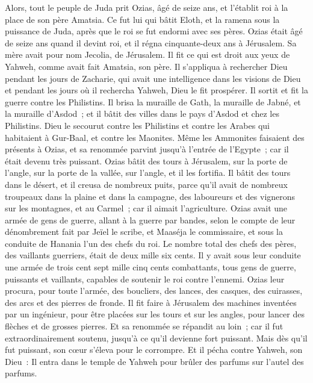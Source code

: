 \begin{multicols}{2}
\VerseOne{}Alors, tout le peuple de Juda prit Ozias, âgé de seize ans, et l'établit roi à la place de son père Amatsia.
Ce fut lui qui bâtit Eloth, et la ramena sous la puissance de Juda, après que le roi se fut endormi avec ses pères.
Ozias était âgé de seize ans quand il devint roi, et il régna cinquante-deux ans à Jérusalem. Sa mère avait pour nom Jecolia, de Jérusalem.
Il fit ce qui est droit aux yeux de Yahweh, comme avait fait Amatsia, son père.
Il s'appliqua à rechercher Dieu pendant les jours de Zacharie, qui avait une intelligence dans les visions de Dieu et pendant les jours où il rechercha Yahweh, Dieu le fit prospérer.
Il sortit et fit la guerre contre les Philistins. Il brisa la muraille de Gath, la muraille de Jabné, et la muraille d'Asdod~; et il bâtit des villes dans le pays d'Asdod et chez les Philistins.
Dieu le secourut contre les Philistins et contre les Arabes qui habitaient à Gur-Baal, et contre les Maonites.
Même les Ammonites faisaient des présents à Ozias, et sa renommée parvint jusqu'à l'entrée de l'Egypte~; car il était devenu très puissant.
Ozias bâtit des tours à Jérusalem, sur la porte de l'angle, sur la porte de la vallée, sur l'angle, et il les fortifia.
Il bâtit des tours dans le désert, et il creusa de nombreux puits, parce qu'il avait de nombreux troupeaux dans la plaine et dans la campagne, des laboureurs et des vignerons sur les montagnes, et au Carmel~; car il aimait l'agriculture.
Ozias avait une armée de gens de guerre, allant à la guerre par bandes, selon le compte de leur dénombrement fait par Jeïel le scribe, et Maaséja le commissaire, et sous la conduite de Hanania l'un des chefs du roi.
Le nombre total des chefs des pères, des vaillants guerriers, était de deux mille six cents.
Il y avait sous leur conduite une armée de trois cent sept mille cinq cents combattants, tous gens de guerre, puissants et vaillants, capables de soutenir le roi contre l'ennemi.
Ozias leur procura, pour toute l'armée, des boucliers, des lances, des casques, des cuirasses, des arcs et des pierres de fronde.
Il fit faire à Jérusalem des machines inventées par un ingénieur, pour être placées sur les tours et sur les angles, pour lancer des flèches et de grosses pierres. Et sa renommée se répandit au loin~; car il fut extraordinairement soutenu, jusqu'à ce qu'il devienne fort puissant.
Mais dès qu'il fut puissant, son cœur s'éleva pour le corrompre. Et il pécha contre Yahweh, son Dieu~: Il entra dans le temple de Yahweh pour brûler des parfums sur l'autel des parfums.

\end{multicols}
